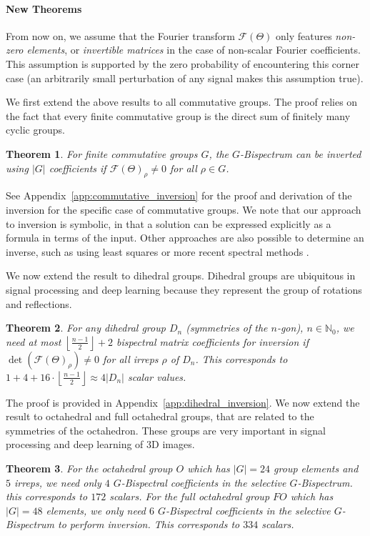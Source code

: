 \documentclass{article}
\theoremstyle{plain}
\newtheorem{theorem}{Theorem}[section]
\theoremstyle{definition}
\theoremstyle{remark}
\begin{document}
\paragraph{New Theorems} From now on, we assume that the Fourier transform $\mathcal{F}(\Theta)$ only features \textit{non-zero elements}, or \textit{invertible matrices} in the case of non-scalar Fourier coefficients. This assumption is supported by the zero probability of encountering this corner case (an arbitrarily small perturbation of any signal makes this assumption true).

We first extend the above results to all commutative groups. The proof relies on the fact that every finite commutative group is the direct sum of finitely many cyclic groups.

\begin{theorem}
For finite commutative groups $G$, the $G$-Bispectrum can be inverted using $|G|$ coefficients if $\mathcal{F}(\Theta)_\rho \neq 0$ for all $\rho \in G$.
\end{theorem}
See Appendix~\ref{app:commutative_inversion} for the proof and derivation of the inversion for the specific case of commutative groups. We note that our approach to inversion is symbolic, in that a solution can be expressed explicitly as a formula in terms of the input.  Other approaches are also possible to determine an inverse, such as using least squares \citep{haniff1991least} or more recent spectral methods \citep{chen2018spectral}.

We now extend the result to dihedral groups. Dihedral groups are ubiquitous in signal processing and deep learning because they represent the group of rotations and reflections.

\begin{theorem}
    For any dihedral group $D_n$ (symmetries of the $n$-gon), $n\in\mathbb{N}_0$, we need at most $\left \lfloor{ \frac{n-1}{2}}\right \rfloor + 2$ bispectral matrix coefficients for inversion if $\det(\mathcal{F}(\Theta)_\rho) \neq 0$ for all irreps $\rho$ of $D_n$. This corresponds to $1+4+16\cdot\left\lfloor{ \frac{n-1}{2}}\right \rfloor\approx 4 |D_n|$ scalar values.
\end{theorem}
The proof is provided in Appendix~\ref{app:dihedral_inversion}.
We now extend the result to octahedral and full octahedral groups, that are related to the symmetries of the octahedron. These groups are very important in signal processing and deep learning of 3D images.

\begin{theorem}
    For the octahedral group $O$ which has $|G| = 24$ group elements and $5$ irreps, we need only $4$ $G$-Bispectral coefficients in the selective $G$-Bispectrum. this corresponds to $172$ scalars. For the full octahedral group $FO$ which has $|G| = 48$ elements, we only need $6$ $G$-Bispectral coefficients in the selective $G$-Bispectrum to perform inversion. This corresponds to $334$ scalars.
\end{theorem}
\end{document}
